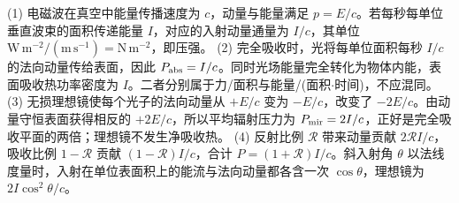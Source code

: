 (1) 电磁波在真空中能量传播速度为 \(c\)，动量与能量满足 \(p=E/c\)。若每秒每单位垂直波束的面积传递能量 \(I\)，对应的入射动量通量为 \(I/c\)，其单位 \(\mathrm{W\,m^{-2}}/(\mathrm{m\,s^{-1}})=\mathrm{N\,m^{-2}}\)，即压强。
(2) 完全吸收时，光将每单位面积每秒 \(I/c\) 的法向动量传给表面，因此 \(P_{\rm abs}=I/c\)。同时光场能量完全转化为物体内能，表面吸收热功率密度为 \(I\)。二者分别属于力/面积与能量/(面积\(\cdot \)时间)，不应混同。
(3) 无损理想镜使每个光子的法向动量从 \(+E/c\) 变为 \(-E/c\)，改变了 \(-2E/c\)。由动量守恒表面获得相反的 \(+2E/c\)，所以平均辐射压力为 \(P_{\rm mir}=2I/c\)，正好是完全吸收平面的两倍；理想镜不发生净吸收热。
(4) 反射比例 \(\mathcal R\) 带来动量贡献 \(2\mathcal RI/c\)，吸收比例 \(1-\mathcal R\) 贡献 \((1-\mathcal R)I/c\)，合计 \(P=(1+\mathcal R)I/c\)。斜入射角 \(\theta\) 以法线度量时，入射在单位表面积上的能流与法向动量都各含一次 \(\cos\theta\)，理想镜为 \(2I\cos^2\theta/c\)。
